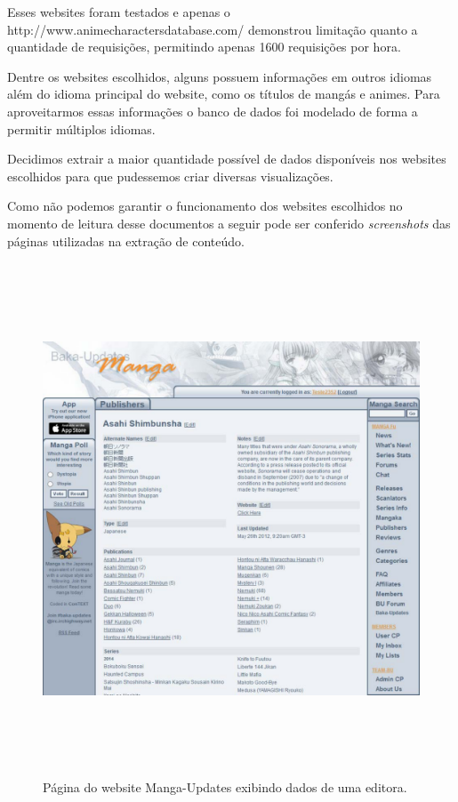 \documentclass[12pt]{article}
\begin{document}
Esses websites foram testados e apenas o http://www.animecharactersdatabase.com/ demonstrou limitação quanto a quantidade de requisições, permitindo apenas 1600 requisições por hora.

Dentre os websites escolhidos, alguns possuem informações em outros idiomas além do idioma principal do website, como os títulos de mangás e animes. Para aproveitarmos essas informações o banco de dados foi modelado de forma a permitir múltiplos idiomas. 

Decidimos extrair a maior quantidade possível de dados disponíveis nos websites escolhidos para que pudessemos criar diversas visualizações.

Como não podemos garantir o funcionamento dos websites escolhidos no momento de leitura desse documentos a seguir pode ser conferido \textit{screenshots} das páginas utilizadas na extração de conteúdo.

\begin{figure}[H]
\centering
\includegraphics[height=6in,width=1\textwidth]{asahi.pdf}
\caption{Página do website Manga-Updates exibindo dados de uma editora.} \label{collection}
\end{figure}
\end{document}
